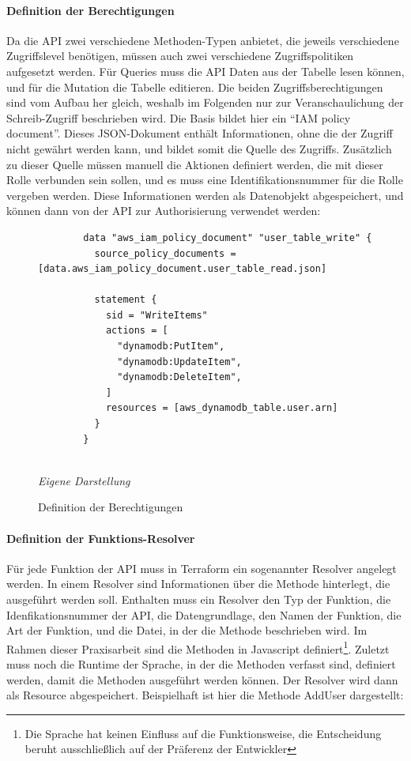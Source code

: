 	\paragraph{Definition der Berechtigungen}
	Da die API zwei verschiedene Methoden-Typen anbietet, die jeweils verschiedene Zugriffslevel benötigen, müssen auch zwei verschiedene Zugriffspolitiken aufgesetzt werden. Für Queries muss die API Daten aus der Tabelle lesen können, und für die Mutation die Tabelle editieren. Die beiden Zugriffsberechtigungen sind vom Aufbau her gleich, weshalb im Folgenden nur zur Veranschaulichung der Schreib-Zugriff beschrieben wird. Die Basis bildet hier ein ``IAM policy document''. Dieses JSON-Dokument enthält Informationen, ohne die der Zugriff nicht gewährt werden kann, und bildet somit die Quelle des Zugriffs. Zusätzlich zu dieser Quelle müssen manuell die Aktionen definiert werden, die mit dieser Rolle verbunden sein sollen, und es muss eine Identifikationsnummer für die Rolle vergeben werden. Diese Informationen werden als Datenobjekt abgespeichert, und können dann von der API zur Authorisierung verwendet werden:
	\newline
	\newline
		\begin{figure}[H]
		\centering
		\begin{minipage}[t]{.7\textwidth} %
		\caption{Definition der Berechtigungen} %
		\begin{verbatim}
		data "aws_iam_policy_document" "user_table_write" {
		  source_policy_documents = [data.aws_iam_policy_document.user_table_read.json]
		
		  statement {
		    sid = "WriteItems"
		    actions = [
		      "dynamodb:PutItem",
		      "dynamodb:UpdateItem",
		      "dynamodb:DeleteItem",
		    ]
		    resources = [aws_dynamodb_table.user.arn]
		  }
		}
		
		\end{verbatim}
		
		\textit{Eigene Darstellung} %
		\label{fig:berechtigungsDefinition}
		\end{minipage}
		\end{figure}
	\paragraph{Definition der Funktions-Resolver}
	Für jede Funktion der API muss in Terraform ein sogenannter Resolver angelegt werden. In einem Resolver sind Informationen über die Methode hinterlegt, die ausgeführt werden soll. Enthalten muss ein Resolver den Typ der Funktion, die Idenfikationsnummer der API, die Datengrundlage, den Namen der Funktion, die Art der Funktion, und die Datei, in der die Methode beschrieben wird. Im Rahmen dieser Praxisarbeit sind die Methoden in Javascript definiert\footnote{Die Sprache hat keinen Einfluss auf die Funktionsweise, die Entscheidung beruht ausschließlich auf der Präferenz der Entwickler}. Zuletzt muss noch die Runtime der Sprache, in der die Methoden verfasst sind, definiert werden, damit die Methoden ausgeführt werden können. Der Resolver wird dann als Resource abgespeichert. Beispielhaft ist hier die Methode AddUser dargestellt:
	
